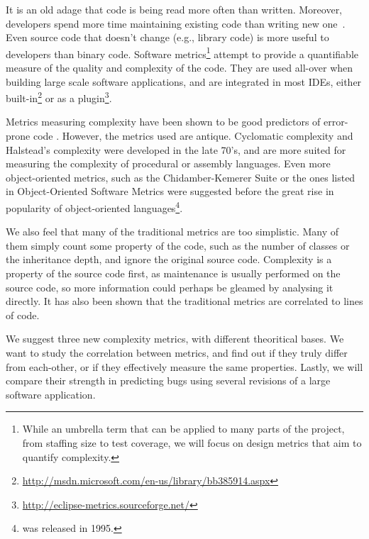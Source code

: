 It is an old adage that code is being read more often than written.
Moreover, developers spend more time maintaining existing code than writing new one~\cite{Pearse:Oman:95, Alkhatib:92}.
Even source code that doesn't change (e.g., library code) is more useful to developers than binary code\cite{Weiser:87}.
Software metrics\footnote{While an umbrella term that can be applied to many parts of the project, from staffing size to test coverage\cite{Lorenz:Kidd:94}, we will focus on design metrics that aim to quantify complexity.} attempt to provide a quantifiable measure of the quality and complexity of the code\cite{Perlis:Sayward:Shaw:81}.
They are used all-over when building large scale software applications, and are integrated in most IDEs, either built-in\footnote{\url{http://msdn.microsoft.com/en-us/library/bb385914.aspx}} or as a plugin\footnote{\url{http://eclipse-metrics.sourceforge.net/}}.

Metrics measuring complexity have been shown to be good predictors of error-prone code \cite{Subramanyam:Krishnan:03, Khoshgoftaar:Munson:90, Olague:Etzkorn:Gholston:Quattlebaum:07}.
However, the metrics used are antique.
Cyclomatic complexity\cite{McCabe:76} and Halstead's complexity\cite{Halstead:77} were developed in the late 70's, and are more suited for measuring the complexity of procedural or assembly languages.
Even more object-oriented metrics, such as the Chidamber-Kemerer Suite\cite{Chidamber:Kemerer:94} or the ones listed in Object-Oriented Software Metrics\cite{Lorenz:Kidd:94} were suggested before the great rise in popularity of object-oriented languages\footnote{\Java was released in 1995.}.

We also feel that many of the traditional metrics are too simplistic.
Many of them simply count some property of the code, such as the number of classes or the inheritance depth, and ignore the original source code.
Complexity is a property of the source code first, as maintenance is usually performed on the source code, so more information could perhaps be gleamed by analysing it directly.
It has also been shown that the traditional metrics are correlated to lines of code\cite{Shepperd:88, Herraiz:et:al:07}.

We suggest three new complexity metrics, with different theoritical bases.
We want to study the correlation between metrics, and find out if they truly differ from each-other, or if they effectively measure the same properties.
Lastly, we will compare their strength in predicting bugs using several revisions of a large software application.
